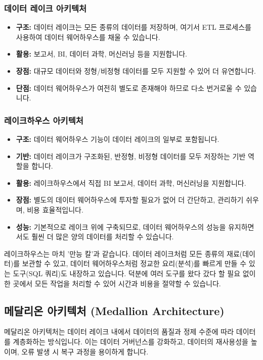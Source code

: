 \documentclass[11pt,a4paper]{article}
\theoremstyle{definition}
\begin{document}
\subsubsection{데이터 레이크 아키텍처}
\begin{itemize}
    \item \textbf{구조:} 데이터 레이크는 모든 종류의 데이터를 저장하며, 여기서 ETL 프로세스를 사용하여 데이터 웨어하우스를 채울 수 있습니다.
    \item \textbf{활용:} 보고서, BI, 데이터 과학, 머신러닝 등을 지원합니다.
    \item \textbf{장점:} 대규모 데이터와 정형/비정형 데이터를 모두 지원할 수 있어 더 유연합니다.
    \item \textbf{단점:} 데이터 웨어하우스가 여전히 별도로 존재해야 하므로 다소 번거로울 수 있습니다.
\end{itemize}

\subsubsection{레이크하우스 아키텍처}
\begin{itemize}
    \item \textbf{구조:} 데이터 웨어하우스 기능이 데이터 레이크의 일부로 포함됩니다.
    \item \textbf{기반:} 데이터 레이크가 구조화된, 반정형, 비정형 데이터를 모두 저장하는 기반 역할을 합니다.
    \item \textbf{활용:} 레이크하우스에서 직접 BI 보고서, 데이터 과학, 머신러닝을 지원합니다.
    \item \textbf{장점:} 별도의 데이터 웨어하우스에 투자할 필요가 없어 더 간단하고, 관리하기 쉬우며, 비용 효율적입니다.
    \item \textbf{성능:} 기본적으로 레이크 위에 구축되므로, 데이터 웨어하우스의 성능을 유지하면서도 훨씬 더 많은 양의 데이터를 처리할 수 있습니다.
\end{itemize}

\begin{examplebox}[title=레이크하우스의 장점]
레이크하우스는 마치 '만능 칼'과 같습니다. 데이터 레이크처럼 모든 종류의 재료(데이터)를 보관할 수 있고, 데이터 웨어하우스처럼 정교한 요리(분석)를 빠르게 만들 수 있는 도구(SQL 쿼리)도 내장하고 있습니다. 덕분에 여러 도구를 왔다 갔다 할 필요 없이 한 곳에서 모든 작업을 처리할 수 있어 시간과 비용을 절약할 수 있습니다.
\end{examplebox}

\subsection{메달리온 아키텍처 (Medallion Architecture)}
메달리온 아키텍처는 데이터 레이크 내에서 데이터의 품질과 정제 수준에 따라 데이터를 계층화하는 방식입니다. 이는 데이터 거버넌스를 강화하고, 데이터의 재사용성을 높이며, 오류 발생 시 복구 과정을 용이하게 합니다.
\end{document}
